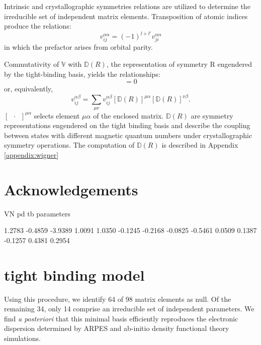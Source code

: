 \documentclass[twocolumn,showpacs,preprintnumbers,superscriptaddress,prb,floatfix,aps,10pt]{revtex4-1}
\newcommand*{\wignerD}{\mathbb{D}(R)}
\begin{document}
Intrinsic and crystallographic symmetries relations are utilized to determine the irreducible set of independent matrix elements. Transposition of atomic indices produce the relations:
\begin{equation}
\label{eq:transposition}
v_{ij}^{\alpha\alpha} = (-1)^{l+l'}v_{ji}^{\alpha\alpha}
\end{equation}
in which the prefactor arises from orbital parity.

Commutativity of $\mathbb{V}$ with $\wignerD$, the representation of symmetry R engendered by the tight-binding basis, yields the relationships:
\begin{equation}
[\mathbb{V},\wignerD] = 0
\end{equation}
or, equivalently,
\begin{equation}
\label{eq:stab}
v_{ij}^{\alpha\beta} = \sum_{\mu\nu} v_{ij}^{\alpha\beta} \left[\wignerD\right]^{\mu\alpha} \left[\wignerD\right]^{\nu\beta}.
\end{equation}
$\left[\phantom{a}\cdot\phantom{a}\right] ^{\mu\alpha}$ selects element $\mu\alpha$ of the enclosed matrix. $\wignerD$ are symmetry representations engendered on the tight binding basis and describe the coupling between states with different magnetic quantum numbers under crystallographic symmetry operations. The computation of $\wignerD$ is described in Appendix \ref{appendix:wigner}

\section{Acknowledgements}



\clearpage

VN pd tb parameters

    1.2783
   -0.4859
   -3.9389
    1.0091
    1.0350
   -0.1245
   -0.2168
   -0.0825
   -0.5461
    0.0509
    0.1387
   -0.1257
    0.4381
    0.2954




\appendix


\section{tight binding model}\label{appendix:tb}




Using this procedure, we identify 64 of 98 matrix elements as null. Of the remaining 34, only 14 comprise an irreducible set of independent parameters. We find \emph{a posteriori} that this minimal basis efficiently reproduces the electronic dispersion determined by ARPES and ab-initio density functional theory simulations.
\end{document}
